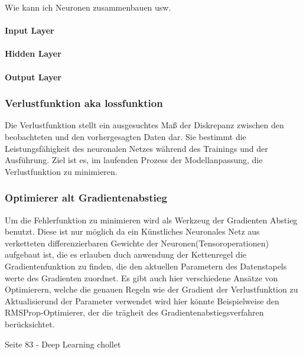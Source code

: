 Wie kann ich Neuronen zusammenbauen usw.

\paragraph{Input Layer}

\paragraph{Hidden Layer}

\paragraph{Output Layer}

\subsubsection{Verlustfunktion aka lossfunktion}
Die Verlustfunktion stellt ein ausgesuchtes Maß der Diskrepanz zwischen den beobachteten und den vorhergesagten Daten dar. Sie bestimmt die Leistungsfähigkeit des neuronalen Netzes während des Trainings und der Ausführung. Ziel ist es, im laufenden Prozess der Modellanpassung, die Verlustfunktion zu minimieren.

\subsubsection{Optimierer alt Gradientenabstieg}
Um die Fehlerfunktion zu minimieren wird als Werkzeug der Gradienten Abstieg benutzt. Diese ist nur möglich da ein Künstliches Neuronales Netz aus verketteten differenzierbaren Gewichte der Neuronen(Tensoroperationen) aufgebaut ist, die es erlauben duch anwendung der Kettenregel die Gradientenfunktion zu finden, die den aktuellen Parametern des Datenstapels werte des Gradienten zuordnet. Es gibt auch hier verschiedene Ansätze von Optimierern, welche die genauen Regeln wie der Gradient der Verlustfunktion zu Aktualisierund der Parameter verwendet wird hier könnte Beispielweise den RMSProp-Optimierer, der die trägheit des Gradientenabstiegsverfahren berücksichtet.

Seite 83 - Deep Learning chollet

